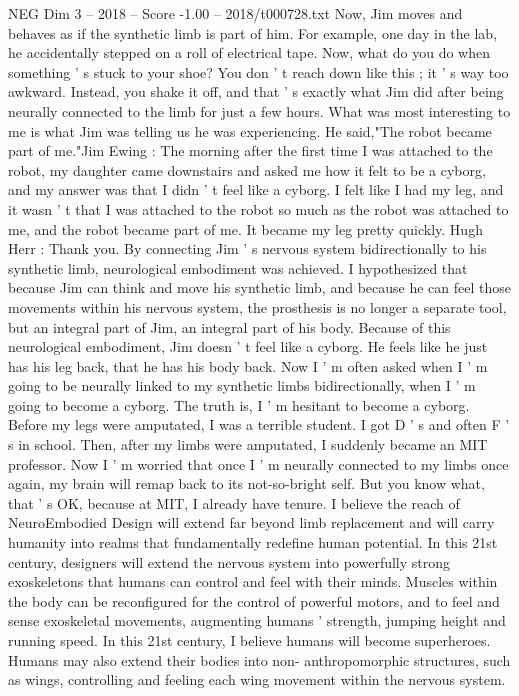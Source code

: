 \begin{textsample}{NEG Dim 3 – 2018 – Score -1.00 – 2018/t000728.txt}
Now, Jim moves and behaves as if the synthetic limb is part of him.
For example, one day in the lab, he accidentally stepped on a roll of electrical tape.
Now, what do you do when something ' s stuck to your shoe?
You don ' t reach down like this ; it ' s way too awkward.
Instead, you shake it off, and that ' s exactly what Jim did after being neurally connected to the limb for just a few hours.
What was most interesting to me is what Jim was telling us he was experiencing.
He said,"The robot became part of me."Jim Ewing : The morning after the first time I was attached to the robot, my daughter came downstairs and asked me how it felt to be a cyborg, and my answer was that I didn ' t feel like a cyborg.
I felt like I had my leg, and it wasn ' t that I was attached to the robot so much as the robot was attached to me, and the robot became part of me.
It became my leg pretty quickly.
Hugh Herr : Thank you.
By connecting Jim ' s nervous system bidirectionally to his synthetic limb, neurological embodiment was achieved.
I hypothesized that because Jim can think and move his synthetic limb, and because he can feel those movements within his nervous system, the prosthesis is no longer a separate tool, but an integral part of Jim, an integral part of his body.
Because of this neurological embodiment, Jim doesn ' t feel like a cyborg.
He feels like he just has his leg back, that he has his body back.
Now I ' m often asked when I ' m going to be neurally linked to my synthetic limbs bidirectionally, when I ' m going to become a cyborg.
The truth is, I ' m hesitant to become a cyborg.
Before my legs were amputated, I was a terrible student.
I got D ' s and often F ' s in school.
Then, after my limbs were amputated, I suddenly became an MIT professor.
Now I ' m worried that once I ' m neurally connected to my limbs once again, my brain will remap back to its not-so-bright self.
But you know what, that ' s OK, because at MIT, I already have tenure.
I believe the reach of NeuroEmbodied Design will extend far beyond limb replacement and will carry humanity into realms that fundamentally redefine human potential.
In this 21st century, designers will extend the nervous system into powerfully strong exoskeletons that humans can control and feel with their minds.
Muscles within the body can be reconfigured for the control of powerful motors, and to feel and sense exoskeletal movements, augmenting humans ' strength, jumping height and running speed.
In this 21st century, I believe humans will become superheroes.
Humans may also extend their bodies into non- anthropomorphic structures, such as wings, controlling and feeling each wing movement within the nervous system.

\end{textsample}
